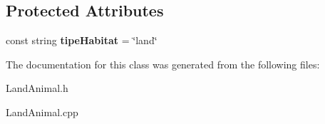 \subsection*{Protected Attributes}
\begin{DoxyCompactItemize}
\item 
\hypertarget{classLandAnimal_a5752a73759922767a929a6ca1bcfc017}{const string {\bfseries tipe\-Habitat} = \char`\"{}land\char`\"{}}\label{classLandAnimal_a5752a73759922767a929a6ca1bcfc017}

\end{DoxyCompactItemize}


The documentation for this class was generated from the following files\-:\begin{DoxyCompactItemize}
\item 
Land\-Animal.\-h\item 
Land\-Animal.\-cpp\end{DoxyCompactItemize}
